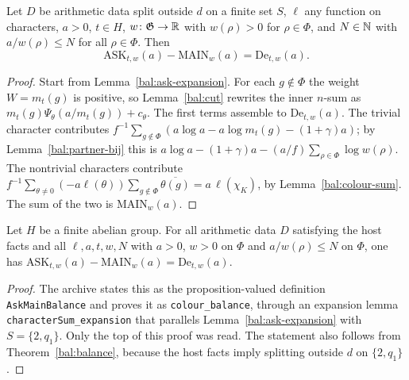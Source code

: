 \begin{theorem}\label{bal:balance}
Let $D$ be arithmetic data split outside $d$ on a finite set $S$, $\ell$ any function on characters, $a>0$, $t\in H$, $w\colon\mathfrak G\to\mathbb{R}$ with $w(\rho)>0$ for $\rho\in\Phi$, and $N\in\mathbb{N}$ with $a/w(\rho)\le N$ for all $\rho\in\Phi$. Then
\[\mathrm{ASK}_{t,w}(a)-\mathrm{MAIN}_w(a)=\mathrm{De}_{t,w}(a).\]
\end{theorem}
\begin{proof}
Start from Lemma~\ref{bal:ask-expansion}. For each $g\notin\Phi$ the weight $W=m_t(g)$ is positive, so Lemma~\ref{bal:cut} rewrites the inner $n$-sum as $m_t(g)\Psi_{\theta}(a/m_t(g))+c_{\theta}$. The first terms assemble to $\mathrm{De}_{t,w}(a)$. The trivial character contributes $f^{-1}\sum_{g\notin\Phi}(a\log a-a\log m_t(g)-(1+\gamma)a)$; by Lemma~\ref{bal:partner-bij} this is $a\log a-(1+\gamma)a-(a/f)\sum_{\rho\in\Phi}\log w(\rho)$. The nontrivial characters contribute $f^{-1}\sum_{\theta\ne0}(-a\ell(\theta))\sum_{g\notin\Phi}\overline{\theta(g)}=a\,\ell(\chi_K)$, by Lemma~\ref{bal:colour-sum}. The sum of the two is $\mathrm{MAIN}_w(a)$.
\end{proof}

\begin{lemma}\label{bal:balance-hostfacts}
Let $H$ be a finite abelian group. For all arithmetic data $D$ satisfying the host facts and all $\ell,a,t,w,N$ with $a>0$, $w>0$ on $\Phi$ and $a/w(\rho)\le N$ on $\Phi$, one has $\mathrm{ASK}_{t,w}(a)-\mathrm{MAIN}_w(a)=\mathrm{De}_{t,w}(a)$.
\end{lemma}
\begin{proof}
The archive states this as the proposition-valued definition \texttt{AskMainBalance} and proves it as \texttt{colour\_balance}, through an expansion lemma \texttt{characterSum\_expansion} that parallels Lemma~\ref{bal:ask-expansion} with $S=\{2,q_1\}$. Only the top of this proof was read. The statement also follows from Theorem~\ref{bal:balance}, because the host facts imply splitting outside $d$ on $\{2,q_1\}$.
\end{proof}

